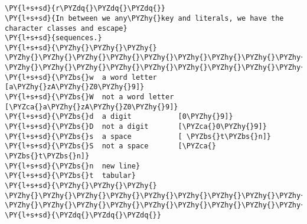 

\section*{}

\begin{Verbatim}[commandchars=\\\{\}]
\PY{l+s+sd}{r\PYZdq{}\PYZdq{}\PYZdq{}}
\PY{l+s+sd}{In between we any\PYZhy{}key and literals, we have the character classes and escape}
\PY{l+s+sd}{sequences.}
\PY{l+s+sd}{\PYZhy{}\PYZhy{}\PYZhy{} \PYZhy{}\PYZhy{}\PYZhy{}\PYZhy{}\PYZhy{}\PYZhy{}\PYZhy{}\PYZhy{}\PYZhy{}\PYZhy{}\PYZhy{}\PYZhy{}\PYZhy{}\PYZhy{}\PYZhy{}\PYZhy{}\PYZhy{} \PYZhy{}\PYZhy{}\PYZhy{}\PYZhy{}\PYZhy{}\PYZhy{}\PYZhy{}\PYZhy{}\PYZhy{}\PYZhy{}\PYZhy{}\PYZhy{}}
\PY{l+s+sd}{\PYZbs{}w  a word letter     [a\PYZhy{}zA\PYZhy{}Z0\PYZhy{}9]}
\PY{l+s+sd}{\PYZbs{}W  not a word letter [\PYZca{}a\PYZhy{}zA\PYZhy{}Z0\PYZhy{}9]}
\PY{l+s+sd}{\PYZbs{}d  a digit           [0\PYZhy{}9]}
\PY{l+s+sd}{\PYZbs{}D  not a digit       [\PYZca{}0\PYZhy{}9]}
\PY{l+s+sd}{\PYZbs{}s  a space           [ \PYZbs{}t\PYZbs{}n]}
\PY{l+s+sd}{\PYZbs{}S  not a space       [\PYZca{} \PYZbs{}t\PYZbs{}n]}
\PY{l+s+sd}{\PYZbs{}n  new line}
\PY{l+s+sd}{\PYZbs{}t  tabular}
\PY{l+s+sd}{\PYZhy{}\PYZhy{}\PYZhy{} \PYZhy{}\PYZhy{}\PYZhy{}\PYZhy{}\PYZhy{}\PYZhy{}\PYZhy{}\PYZhy{}\PYZhy{}\PYZhy{}\PYZhy{}\PYZhy{}\PYZhy{}\PYZhy{}\PYZhy{}\PYZhy{}\PYZhy{} \PYZhy{}\PYZhy{}\PYZhy{}\PYZhy{}\PYZhy{}\PYZhy{}\PYZhy{}\PYZhy{}\PYZhy{}\PYZhy{}\PYZhy{}\PYZhy{}}
\PY{l+s+sd}{\PYZdq{}\PYZdq{}\PYZdq{}}
\end{Verbatim}

